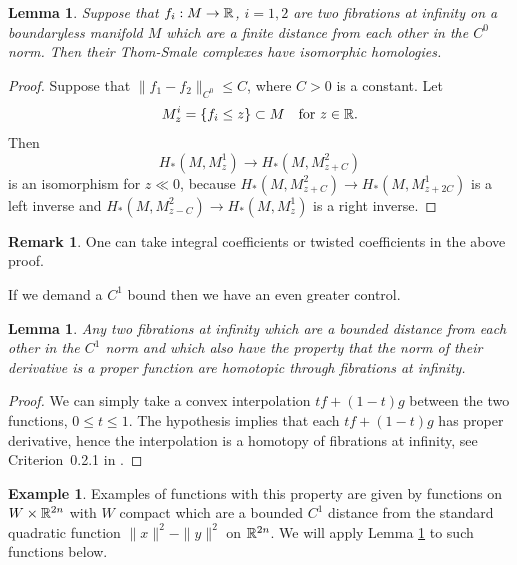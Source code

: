 \documentclass[11pt]{article}
\numberwithin{equation}{section}\providecommand{\dpl}{\displaystyle}
\theoremstyle{plain}
\newtheorem{lemma}[theorem]{Lemma}
\theoremstyle{definition}
\newtheorem{remark}[theorem]{Remark}
\newtheorem{example}[theorem]{Example}
\begin{document}
\begin{lemma}\label{Lemma: bars}
Suppose that $f_i:M \to \mathbb{R}$, $i=1,2$ are two fibrations at infinity on a boundaryless manifold $M$ which are a finite distance from each other in the $C^0$ norm. Then their Thom-Smale complexes have isomorphic homologies.
\end{lemma}
\begin{proof}
Suppose that $\|f_1-f_2\|_{C^0} \leq C$, where $C>0$ is a constant. Let
\[
M^i_z=\{f_i \leq z \} \subset M\quad\text{for }z \in \mathbb{R}.
\]
Then
\[
H_*(M,M^1_z) \to H_*(M,M^2_{z+C})
\]
is an isomorphism for $z \ll 0$, because $H_*(M,M^2_{z+C}) \to H_*(M,M^1_{z+2C})$ is a left inverse and $H_*(M,M^2_{z-C}) \to H_*(M,M^1_z)$ is a right inverse. \end{proof}

\begin{remark} One can take integral coefficients or twisted coefficients in the above proof. \end{remark}

If we demand a $C^1$ bound then we have an even greater control.

\begin{lemma}\label{lemma: we need C1}
Any two fibrations at infinity which are a bounded distance from each other in the $C^1$ norm and which also have the property that the norm of their derivative is a proper function are homotopic through fibrations at infinity.
\end{lemma}

\begin{proof}
We can simply take a convex interpolation $tf+(1-t)g$ between the two functions, $0 \leq t \leq 1$. The hypothesis implies that each $tf+(1-t)g$ has proper derivative, hence the interpolation is a homotopy of fibrations at infinity, see Criterion~0.2.1 in \cite{EG98}.
\end{proof}

\begin{example}\label{ex: standard quadratic}
Examples of functions with this property are given by functions on $W\times \mathbb{R}^{2n}$ with $W$ compact which are a bounded $C^1$ distance from the standard quadratic function $\|x\|^2-\|y\|^2$ on $\mathbb{R}^{2n}$. We will apply Lemma \ref{lemma: we need C1} to such functions below.
\end{example}
\end{document}
